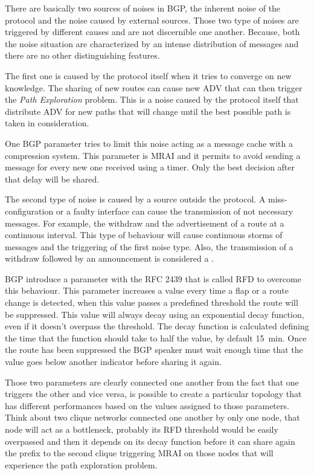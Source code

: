 There are basically two sources of noises in \ac{BGP}, the inherent noise of
the protocol and the noise caused by external sources.
Those two type of noises are triggered by different causes and are
not discernible one another.
Because, both the noise situation are characterized by an intense distribution
of messages and there are no other distinguishing features.

The first one is caused by the protocol itself when it tries to converge
on new knowledge.
The sharing of new routes can cause new \ac{ADV} that can then trigger the
\textit{Path Exploration} problem.
This is a noise caused by the protocol itself that distribute \ac{ADV} for
new paths that will change until the best possible path is taken in consideration.

One \ac{BGP} parameter tries to limit this noise acting as a message cache with
a compression system.
This parameter is \ac{MRAI} and it permits to avoid sending a message for every
new one received using a timer.
Only the best decision after that delay will be shared.

The second type of noise is caused by a source outside the protocol.
A miss-configuration or a faulty interface can cause the transmission of not necessary messages.
For example, the withdraw and the advertisement of a route at a continuous interval.
This type of behaviour will cause continuous storms of messages and the triggering
of the first noise type.
Also, the transmission of a withdraw followed by an announcement is considered
a .

\ac{BGP} introduce a parameter with the \ac{RFC} \num{2439} \cite{rfc2439} that
is called \ac{RFD} to overcome this behaviour.
This parameter increases a value every time a flap or a route change is detected,
when this value passes a predefined threshold the route will be suppressed.
This value will always decay using an exponential decay function, even if it
doesn't overpass the threshold.
The decay function is calculated defining the time that the function should take
to half the value, by default \SI{15}{\minute}.
Once the route has been suppressed the \ac{BGP} speaker must wait enough time
that the value goes below another indicator before sharing it again.

Those two parameters are clearly connected one another from the fact that
one triggers the other and vice versa, is possible to create a particular topology
that has different performances based on the values assigned to those
parameters.
Think about two clique networks connected one another by only one node, that
node will act as a bottleneck, probably its \ac{RFD} threshold would be easily
overpassed and then it depends on its decay function before it can share
again the prefix to the second clique triggering \ac{MRAI} on those nodes that
will experience the path exploration problem.

